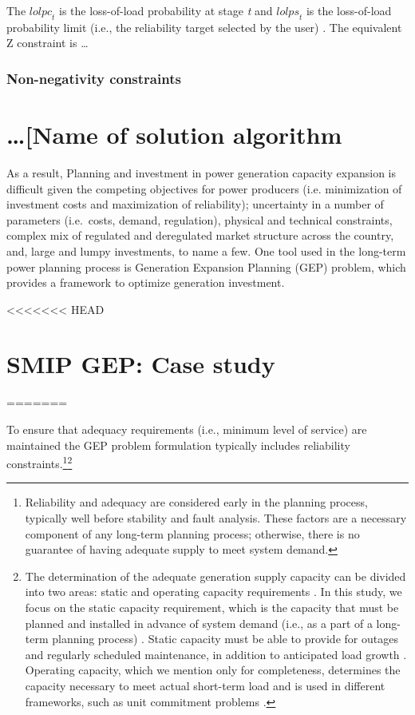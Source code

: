 \documentclass[10pt]{amsart}
\begin{document}
The $\textit{lolpc}_{t}$ is the loss-of-load probability at stage \textit{t} and $\textit{lolps}_{t}$ is the loss-of-load probability limit (i.e., the reliability target selected by the user) \parencite{dragoon:2006aa}. 
The equivalent Z constraint is \ldots


\subsubsection{Non-negativity constraints \nopunct}

\section{\ldots [Name of solution algorithm}


As a result, 
Planning and investment in power generation capacity expansion is difficult given the competing objectives for power producers (i.e. minimization of investment costs and maximization of reliability); uncertainty in a number of parameters (i.e.\ costs, demand, regulation), physical and technical constraints, complex mix of regulated and deregulated market structure across the country, and, large and lumpy investments, to name a few. 
One tool used in the long-term power planning process is Generation Expansion Planning (GEP) problem, which provides a framework to optimize generation investment.
	
<<<<<<< HEAD
\section{SMIP GEP: Case study}
=======

To ensure that adequacy requirements (i.e., minimum level of service) are maintained the GEP problem formulation typically includes reliability constraints.\footnote{Reliability and adequacy are considered early in the planning process, typically well before stability and fault analysis. These factors are a necessary component of any long-term planning process; otherwise, there is no guarantee of having adequate supply to meet system demand.}\footnote{The determination of the adequate generation supply capacity can be divided into two areas: static and operating capacity requirements \parencite{billinton1984reliability}.
In this study, we focus on the static capacity requirement, which is the capacity that must be planned and installed in advance of system demand (i.e., as a part of a long-term planning process) \parencite{billinton1984reliability}.
Static capacity must be able to provide for outages and regularly scheduled maintenance, in addition to anticipated load growth \parencite{billinton1984reliability}.
Operating capacity, which we mention only for completeness, determines the capacity necessary to meet actual short-term load and is used in different frameworks, such as unit commitment problems \parencite{billinton1984reliability}.}
	 
\end{document}
